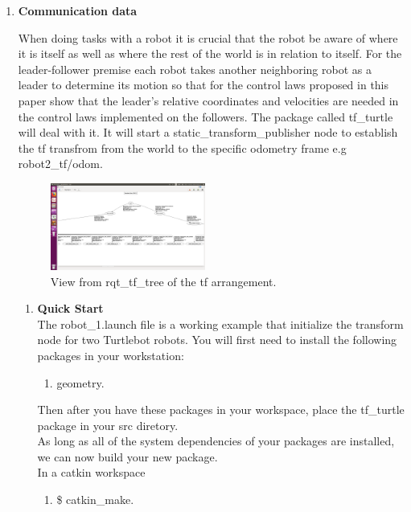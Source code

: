 \documentclass[journal]{IEEEtran}
\begin{document}
\begin{enumerate}
\begin{enumerate}
\end{enumerate}



\item \textbf {Communication data}

When doing tasks with a robot it is crucial that the robot be
aware of where it is itself as well as where the rest of the world
is in relation to itself. For the leader-follower premise each robot takes another neighboring robot as a leader to determine its motion so that for the control laws proposed in this paper show that the leader’s relative coordinates and velocities are needed in the control laws implemented on the followers. The package called tf{\_}turtle will deal with it. It will start a static{\_}transform{\_}publisher node to establish the tf transfrom from the world to the specific odometry frame e.g robot2{\_}tf/odom.

\begin{figure}[!h]
\begin{center}
\includegraphics[width=2in]{3.png}
\caption{View from rqt{\_}tf{\_}tree of the tf arrangement.}
\end{center}
\label{fig:mypicture4}
\end{figure}


\begin{enumerate}
\item \textbf {Quick Start}\\
The robot{\_}1.launch file is a working example that initialize the transform node for two Turtlebot robots.
You will first need to install the following packages in your workstation:
\begin{enumerate}
\item {geometry}\cite{temp10}.

\end{enumerate}

Then after you have these packages in your workspace, place the tf{\_}turtle\cite{temp11} package in your src diretory.\\
As long as all of the system dependencies of your packages are installed, we can now build your new package.\\
In a catkin workspace
\begin{enumerate} 
\item {{\$} catkin{\_}make}.
\end{enumerate}


\end{enumerate}
\end{enumerate}
\end{document}
